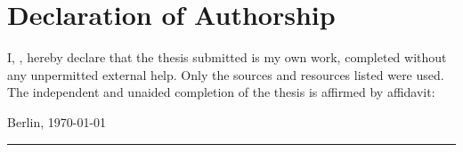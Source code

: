 

\chapter*{Declaration of Authorship}
	\noindent I, \textsc{\trauthor}, hereby declare that the thesis submitted is my own work, completed without any unpermitted external help. Only the sources and resources listed were used.\\
	
	
	\noindent
	The independent and unaided completion of the thesis is affirmed by affidavit:
	
	
\vspace{5cm}
	
	

	
	Berlin, \today  	\hfill \rule[0.5em]{15em}{0.5pt} %
	
